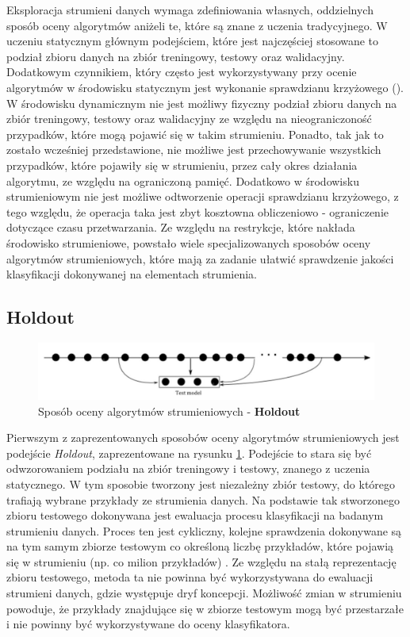 \noindent Eksploracja strumieni danych wymaga zdefiniowania własnych, oddzielnych sposób oceny algorytmów aniżeli te, które są znane z uczenia tradycyjnego. W uczeniu statycznym głównym podejściem, które jest najczęściej stosowane to podział zbioru danych na zbiór treningowy, testowy oraz walidacyjny. Dodatkowym czynnikiem, który często jest wykorzystywany przy ocenie algorytmów w środowisku statycznym jest wykonanie sprawdzianu krzyżowego (). W środowisku dynamicznym nie jest możliwy fizyczny podział zbioru danych na zbiór treningowy, testowy oraz walidacyjny ze względu na nieograniczoność przypadków, które mogą pojawić się w takim strumieniu. Ponadto, tak jak to zostało wcześniej przedstawione, nie możliwe jest przechowywanie wszystkich przypadków, które pojawiły się w strumieniu, przez cały okres działania algorytmu, ze względu na ograniczoną pamięć. Dodatkowo w środowisku strumieniowym nie jest możliwe odtworzenie operacji sprawdzianu krzyżowego, z tego względu, że operacja taka jest zbyt kosztowna obliczeniowo - ograniczenie dotyczące czasu przetwarzania. Ze względu na restrykcje, które nakłada środowisko strumieniowe, powstało wiele specjalizowanych sposobów oceny algorytmów strumieniowych, które mają za zadanie ułatwić sprawdzenie jakości klasyfikacji dokonywanej na elementach strumienia.

\subsection{Holdout}

\begin{figure}[h] 
    \centering
    \includegraphics[width=15cm]{figures/holdout.JPG}
    \caption{Sposób oceny algorytmów strumieniowych - \textbf{Holdout} \cite{Prezentacja:Strumienie}}\label{Figure:Holdout}
\end{figure}

\noindent Pierwszym z zaprezentowanych sposobów oceny algorytmów strumieniowych jest podejście \textit{Holdout}, zaprezentowane na rysunku \ref{Figure:Holdout}. Podejście to stara się być odwzorowaniem podziału na zbiór treningowy i testowy, znanego z uczenia statycznego. W tym sposobie tworzony jest niezależny zbiór testowy, do którego trafiają wybrane przykłady ze strumienia danych. Na podstawie tak stworzonego zbioru testowego dokonywana jest ewaluacja procesu klasyfikacji na badanym strumieniu danych. Proces ten jest cykliczny, kolejne sprawdzenia dokonywane są na tym samym zbiorze testowym co określoną liczbę przykładów, które pojawią się w strumieniu (np. co milion przykładów) \cite{PHD:Kirkby}. Ze względu na stałą reprezentację zbioru testowego, metoda ta nie powinna być wykorzystywana do ewaluacji strumieni danych, gdzie występuje dryf koncepcji. Możliwość zmian w strumieniu powoduje, że przykłady znajdujące się w zbiorze testowym mogą być przestarzałe i nie powinny być wykorzystywane do oceny klasyfikatora.

